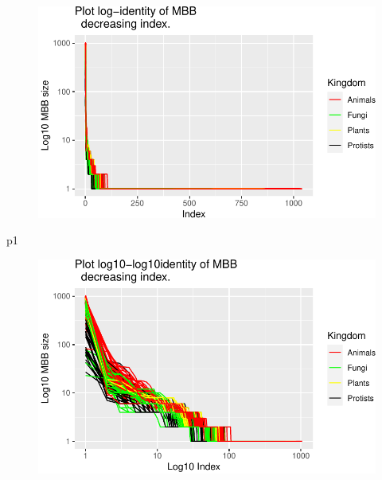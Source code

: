 \documentclass[
  letterpaper,
  DIV=11,
  numbers=noendperiod]{scrreprt}
\newenvironment{Shaded}{}{}
\newcommand{\NormalTok}[1]{\textcolor[rgb]{0.67,0.70,0.75}{#1}}
\begin{document}
\begin{figure}[H]

{\centering \includegraphics[width=1\textwidth,height=\textheight]{index_files/figure-pdf/unnamed-chunk-50-1.pdf}

}

\end{figure}

\begin{Shaded}
\begin{Highlighting}[]
\NormalTok{p1}
\end{Highlighting}
\end{Shaded}

\begin{figure}[H]

{\centering \includegraphics[width=1\textwidth,height=\textheight]{index_files/figure-pdf/unnamed-chunk-50-2.pdf}

}

\end{figure}
\end{document}
